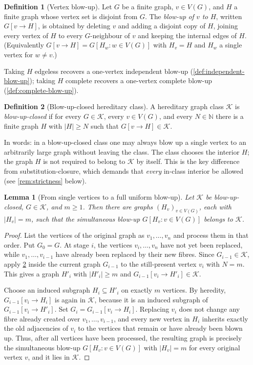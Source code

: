 \documentclass[11pt]{article}
\newtheorem{lemma}[lemma]{Lemma}
\theoremstyle{definition}
\newtheorem{definition}[definition]{Definition}
\newcommand{\K}{\mathcal{K}}
\begin{document}
\begin{definition}[Vertex blow-up]\label{def:vertex-blowup}
Let $G$ be a finite graph, $v\in V(G)$, and $H$ a finite graph whose vertex set is
disjoint from $G$.  The
\emph{blow-up of $v$ to $H$}, written $G[v\to H]$, is obtained by deleting $v$ and adding
a disjoint copy of $H$, joining every vertex of $H$ to every $G$-neighbour of $v$ and
keeping the internal edges of $H$.  (Equivalently $G[v\to H]=G[H_w:w\in V(G)]$ with
$H_v=H$ and $H_w$ a single vertex for $w\ne v$.)
\end{definition}

Taking $H$ edgeless recovers a one-vertex independent blow-up
(\cref{def:independent-blow-up}); taking $H$ complete recovers a one-vertex complete
blow-up (\cref{def:complete-blow-up}).

\begin{definition}[Blow-up-closed hereditary class]\label{def:blow-up-closed}
A hereditary graph class $\K$ is \emph{blow-up-closed} if for every $G\in\K$, every
$v\in V(G)$, and every $N\in\mathbb N$ there is a finite graph $H$ with $|H|\ge N$ such
that $G[v\to H]\in\K$.
\end{definition}

In words: in a blow-up-closed class one may always blow up a single vertex to an
arbitrarily large graph without leaving the class.  The class chooses the interior $H$;
the graph $H$ is not required to belong to $\K$ by itself.  This is the key difference
from substitution-closure, which demands that \emph{every} in-class interior be allowed
(see \cref{rem:strictness} below).

\begin{lemma}[From single vertices to a full uniform blow-up]\label{lem:blowup-iterate}
Let $\K$ be blow-up-closed, $G\in\K$, and $m\ge1$.  Then there are graphs
$(H_v)_{v\in V(G)}$, each with $|H_v|=m$, such that the simultaneous blow-up
$G[H_v:v\in V(G)]$ belongs to $\K$.
\end{lemma}

\begin{proof}
List the vertices of the original graph as $v_1,\dots,v_n$ and process them in that
order.  Put $G_0=G$.  At stage $i$, the vertices $v_i,\dots,v_n$ have not yet been
replaced, while $v_1,\dots,v_{i-1}$ have already been replaced by their new fibres.  Since
$G_{i-1}\in\K$, apply \cref{def:blow-up-closed} inside the current graph $G_{i-1}$ to the
still-present vertex $v_i$ with $N=m$.  This gives a graph $H'_i$ with $|H'_i|\ge m$ and
$G_{i-1}[v_i\to H'_i]\in\K$.

Choose an induced subgraph $H_i\subseteq H'_i$ on exactly $m$ vertices.  By heredity,
$G_{i-1}[v_i\to H_i]$ is again in $\K$, because it is an induced subgraph of
$G_{i-1}[v_i\to H'_i]$.  Set $G_i=G_{i-1}[v_i\to H_i]$.
Replacing $v_i$ does not change any fibre already created over
$v_1,\dots,v_{i-1}$, and every new vertex in $H_i$ inherits exactly the old adjacencies of
$v_i$ to the vertices that remain or have already been blown up.  Thus, after all
vertices have been processed, the resulting graph is precisely the simultaneous blow-up
$G[H_v:v\in V(G)]$ with $|H_v|=m$ for every original vertex $v$, and it lies in $\K$.
\end{proof}
\end{document}

